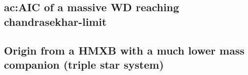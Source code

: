 \subsection{\gls{ac:AIC} of a massive WD reaching \gls{chandrasekhar-limit} \label{sec:LMXBAICFormation}}

\subsection{Origin from a HMXB with a much lower mass companion (triple star system)}




